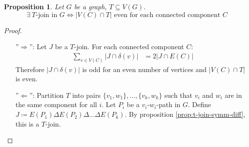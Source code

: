 \documentclass[11pt, a4paper]{article}
\newcommand{\abs}[1]{\left\lvert#1\right\rvert}
\newcommand{\set}[1]{\{#1\}}
\newtheorem{prop}[theorem]{Proposition}
\theoremstyle{remark}
\theoremstyle{definition}
\begin{document}
\begin{prop}\label{prop:t-join-parity}
	Let $G$ be a graph, $T\subseteq V(G)$.
	\[\exists\ T\text{-join in }G \Leftrightarrow \abs{V(C)\cap T}\text{ even for each
			connected component }C\]
\end{prop}
\begin{proof}\
	\begin{enumerate}
		\item[''$\Rightarrow$'':]
		Let $J$ be a $T$-join. For each connected component $C$:
		\begin{align*}
			\sum_{v\in V(C)}\abs{J\cap \delta(v)} & =2\abs{J\cap E(C)}
		\end{align*}
		Therefore $\abs{J\cap\delta(v)}$ is odd for an even number of vertices and
		$\abs{V(C)\cap T}$ is even.

		\item[''$\Leftarrow$'':]
		Partition $T$ into pairs $\set{v_1,w_1},\ldots,\set{v_k,w_k}$ such that
		$v_i$ and $w_i$ are in the same component for all $i$. Let $P_i$ be a
		$v_i$-$w_i$-path in $G$. Define $J\coloneqq E(P_1)\Delta E(P_2)\Delta\ldots
			\Delta E(P_k)$. By proposition \ref{prop:t-join-symm-diff}, this is a
		$T$-join.
	\end{enumerate}
\end{proof}
\end{document}
